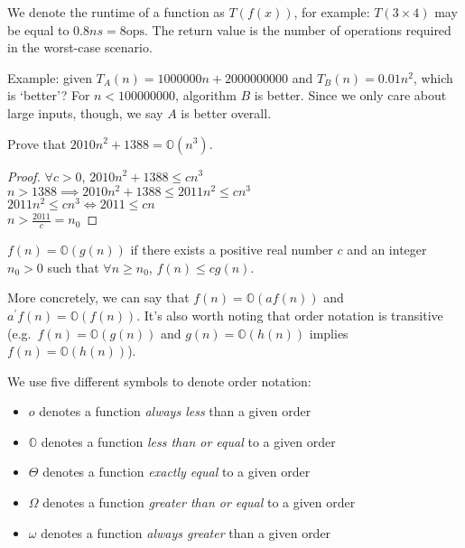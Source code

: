 \documentclass[12pt]{article}
\begin{document}
We denote the runtime of a function as $T(f(x))$, for example: $T(3 \times 4)$ may be equal to $0.8ns = 8\text{ops}$. The return value is the number of operations required in the worst-case scenario.

Example: given $T_A(n) = 1 000 000n + 2 000 000 000$ and $T_B(n) = 0.01n^2$, which is `better'? For $n < 100 000 000$, algorithm $B$ is better. Since we only care about large inputs, though, we say $A$ is better overall.

\begin{example}
Prove that $2010n^2 + 1388 = \mathbb{O}(n^3)$.
\end{example}

\begin{proof}
$\forall c > 0$, $2010 n^2 + 1388 \leq cn^3$\\
$n > 1388 \implies 2010n^2 + 1388 \leq 2011n^2 \leq cn^3$\\
$2011n^2 \leq cn^3 \iff 2011 \leq cn$\\
$n > \frac{2011}{c} = n_0$
\end{proof}

\begin{definition}
$f(n) = \mathbb{O}(g(n))$ if there exists a positive real number $c$ and an integer $n_0 > 0$ such that $\forall n \geq n_0$, $f(n) \leq cg(n)$.
\end{definition}

More concretely, we can say that $f(n) = \mathbb{O}(af(n))$ and $a^\prime f(n) = \mathbb{O}(f(n))$. It's also worth noting that order notation is transitive (e.g.\ $f(n) = \mathbb{O}(g(n))$ and $g(n) = \mathbb{O}(h(n))$ implies $f(n) = \mathbb{O}(h(n))$).

We use five different symbols to denote order notation:
\begin{itemize}
\item $o$ denotes a function \emph{always less} than a given order
\item $\mathbb{O}$ denotes a function \emph{less than or equal} to a given order
\item $\Theta$ denotes a function \emph{exactly equal} to a given order
\item $\Omega$ denotes a function \emph{greater than or equal} to a given order
\item $\omega$ denotes a function \emph{always greater} than a given order
\end{itemize}
\end{document}
